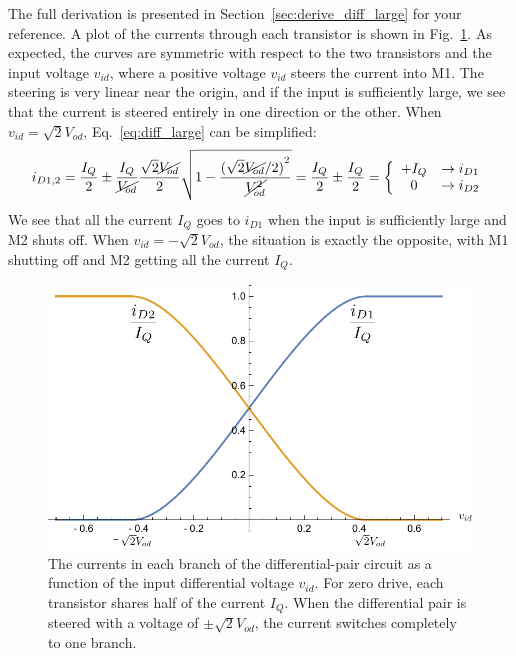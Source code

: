 The full derivation is presented in Section~\ref{sec:derive_diff_large} for your reference.  A plot of the currents through each transistor is shown in Fig.~\ref{fig:mosdiffamp_id}.  As expected, the curves are symmetric with respect to the two transistors and the input voltage $v_{id}$, where a positive voltage $v_{id}$ steers the current into M1.  The steering is very linear near the origin, and if the input is sufficiently large, we see that the current is steered entirely in one direction or the other.  When $v_{id} = \sqrt{2} V_{od}$, Eq.~\ref{eq:diff_large} can be simplified:
\begin{equation} 
	{i_{D1,2}} = \frac{I_Q}{2} \pm \frac{I_Q}{{{\cancel{V_{od}}}}}\frac{{{\sqrt{2} \cancel{V_{od}}}}}{2}
	\sqrt {1 - \frac{{{{({\sqrt{2}\cancel{V_{od}}}/2)}^2}}}{{\cancel{V_{od}^2}}}} 
	= \frac{I_Q}{2} \pm \frac{I_Q}{2} = \left\{ \begin{array}{cc} +I_Q &  \to i_{D1} \\ 0 & \to i_{D2} \end{array} \right.
\end{equation}
We see that all the current $I_Q$ goes to $i_{D1}$ when the input is sufficiently large and M2 shuts off.  When $v_{id} = - \sqrt{2} V_{od}$, the situation is exactly the opposite, with M1 shutting off and M2 getting all the current $I_Q$.
\begin{figure}[tb]
\begin{center}
\includegraphics[width=.7\columnwidth]{mosdiffamp_id}
\end{center}
\caption{The currents in each branch of the differential-pair circuit as a function of the input differential voltage $v_{id}$.  For zero drive, each transistor shares half of the current $I_Q$.  When the differential pair is steered with a voltage of $\pm \sqrt{2} V_{od}$, the current switches completely to one branch.}
\label{fig:mosdiffamp_id}
\end{figure}
